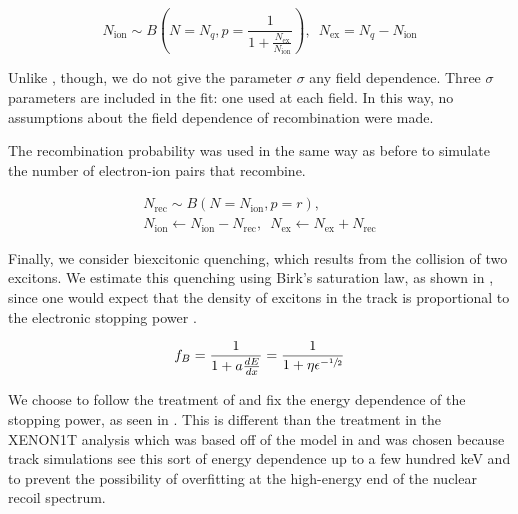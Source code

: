 \begin{equation}
        \label{eqn:xe1t_nr_exciton_ion}
        N_{\textrm{ion}} \sim B \left( N=N_q, p = \frac{1}{1 + \frac{N_{\textrm{ex}}}{N_{\textrm{ion}}}} \right) , \, \, \, N_{\textrm{ex}} = N_q - N_{\textrm{ion}}
\end{equation}

Unlike , though, we do not give the parameter $\sigma$ any field dependence.  Three $\sigma$ parameters are included in the fit: one used at each field.  In this way, no assumptions about the field dependence of recombination were made.  

The recombination probability was used in the same way as before to simulate the number of electron-ion pairs that recombine.


\begin{equation}
        \label{eqn:xe1t_nr_recombination}
        \begin{gathered}
                N_{\textrm{rec}} \sim B(N = N_{\textrm{ion}}, p = r), \\ 
                N_{\textrm{ion}} \leftarrow N_{\textrm{ion}} - N_{\textrm{rec}}, \, \, \,  N_{\textrm{ex}} \leftarrow N_{\textrm{ex}} + N_{\textrm{rec}}
        \end{gathered}
\end{equation}


Finally, we consider biexcitonic quenching, which results from the collision of two excitons.  We estimate this quenching using Birk's saturation law, as shown in \eqnref{}, since one would expect that the density of excitons in the track is proportional to the electronic stopping power \cite{mei2008model, tretyak2010semi, bezrukov2011interplay}.


\begin{equation}
        \label{eqn:nerix_birks_quenching}
        f_B = \frac{1}{1 + a \frac{dE}{dx}} = \frac{1}{1 + \eta \epsilon^{- \sfrac{1}{2}}}
\end{equation}


We choose to follow the treatment of  and fix the energy dependence of the stopping power, as seen in .  This is different than the treatment in the XENON1T analysis which was based off of the model in  and was chosen because track simulations see this sort of energy dependence up to a few hundred keV and to prevent the possibility of overfitting at the high-energy end of the nuclear recoil spectrum.

